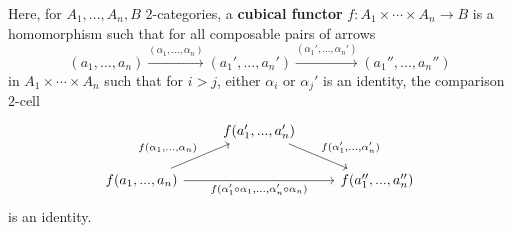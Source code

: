 Here, for $A_1,...,A_n,B$ $2$-categories, a \textbf{cubical functor} $f:A_1\times \cdots \times A_n\rightarrow B$ is a homomorphism such that for all composable pairs of arrows
\begin{equation*}
    (a_1,...,a_n)\xrightarrow{(\alpha_1,...,\alpha_n)}(a_1',...,a_n')\xrightarrow{(\alpha_1',...,\alpha_n')}(a_1'',...,a_n'')
\end{equation*}
in $A_1\times \cdots \times A_n$ such that for $i > j$, either $\alpha_i$ or $\alpha_j'$ is an identity, the comparison $2$-cell
\[\begin{tikzcd}
	& {f(a_1',...,a_n')} \\
	{f(a_1,...,a_n)} && {f(a_1'',...,a_n'')}
	\arrow["{f(\alpha_1'\circ\alpha_1,...,\alpha_n'\circ\alpha_n)}"', from=2-1, to=2-3]
	\arrow["{f(\alpha_1,...,\alpha_n)}", from=2-1, to=1-2]
	\arrow["{f(\alpha_1',...,\alpha_n')}", from=1-2, to=2-3]
\end{tikzcd}\]
is an identity.

